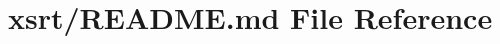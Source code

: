 \hypertarget{xsrt_2_r_e_a_d_m_e_8md}{}\section{xsrt/\+R\+E\+A\+D\+ME.md File Reference}
\label{xsrt_2_r_e_a_d_m_e_8md}
